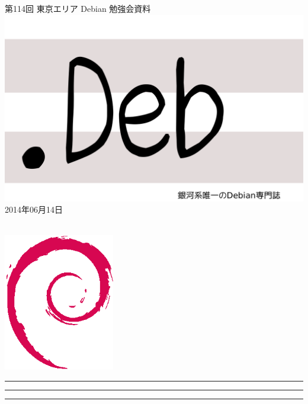 \documentclass[mingoth,a4paper]{jsarticle}
\newcommand{\debmtgyear}{2014}
\newcommand{\debmtgmonth}{06}
\newcommand{\debmtgdate}{14}
\newcommand{\debmtgnumber}{114}
\begin{document}
\begin{titlepage}
\thispagestyle{empty}

\vspace*{-2cm}
第\debmtgnumber{}回 東京エリア Debian 勉強会資料\\
\hspace*{-2cm}
\includegraphics{image2012-natsu/dotdeb.pdf}\\
\hfill{}\debmtgyear{}年\debmtgmonth{}月\debmtgdate{}日

\\

\vspace*{-2cm}
\hfill{}\includegraphics[height=6cm]{image200502/openlogo-nd.eps}
\end{titlepage}

\newpage

\begin{minipage}[b]{0.2\hsize}
 \colorbox{titleback}{}
\end{minipage}
\begin{minipage}[b]{0.8\hsize}
\hrule
\vspace{2mm}
\hrule
\begin{multicols}{2}
\tableofcontents
\end{multicols}
\vspace{2mm}
\hrule
\end{minipage}
\end{document}
